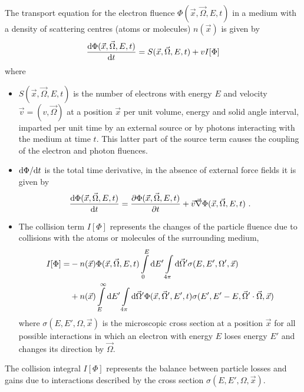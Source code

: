 The transport equation for the electron fluence
$\Phi(\vec{x},\vec{\Omega},E,t)$ in a medium with a density of
scattering centres (atoms or molecules) $n(\vec{x})$ is given by
\begin{equation}
\label{transport1}
{{\rm d}\Phi(\vec{x},\vec{\Omega},E,t) \over {\rm d}t} =
\index{electron transport!general discussion}
S(\vec{x},\vec{\Omega},E,t) + v I[\Phi]
\end{equation}
where
\begin{itemize}
\item
$S(\vec{x},\vec{\Omega},E,t)$ is the number of electrons with energy
$E$ and velocity $\vec{v} = (v,\vec{\Omega})$ at a position $\vec{x}$ per unit
volume, energy and solid angle interval, imparted per unit time
by an external source or
by photons interacting with the medium at time $t$. This latter part of the
source term causes the coupling of the electron and photon fluences.
\item
${\rm d}\Phi/{\rm d}t$ is the total time derivative, in the absence
of external force fields it is given by
\begin{equation}
{{\rm d}\Phi(\vec{x},\vec{\Omega},E,t) \over {\rm d}t}  =
{\partial \Phi(\vec{x},\vec{\Omega},E,t) \over \partial t} +
\vec{v} \vec{\nabla} \Phi(\vec{x},\vec{\Omega},E,t)~.
\end{equation}
\item
{}
The collision term $I[\Phi]$ represents the changes of the particle
fluence due to collisions with the atoms or molecules of the
surrounding medium,
\begin{equation}
\begin{split}
I[\Phi]  =
 & - n(\vec{x}) \Phi(\vec{x},\vec{\Omega},E,t)
\int\limits_0^E {\rm d} E' \int\limits_{4 \pi} {\rm d} \vec{\Omega}'
\sigma(E,E',\Omega',\vec{x}) \\
& +
n(\vec{x}) \int\limits_E^\infty {\rm d} E' \int\limits_{4 \pi}
{\rm d}\vec{\Omega}'
\Phi(\vec{x},\vec{\Omega}',E',t)
\sigma(E',E'-E,\vec{\Omega}'\cdot \vec{\Omega},\vec{x})
\end{split}
\end{equation}
where
$\sigma(E,E',\Omega,\vec{x})$ is the microscopic cross section
at a position $\vec{x}$ for all possible interactions in which
an electron with energy $E$ loses energy $E'$ and changes its direction
by $\vec{\Omega}$.
\end{itemize}
The collision integral $I[\Phi]$ represents the balance between
particle losses and gains due to interactions described by the
cross section $\sigma(E,E',\Omega,\vec{x})$.

